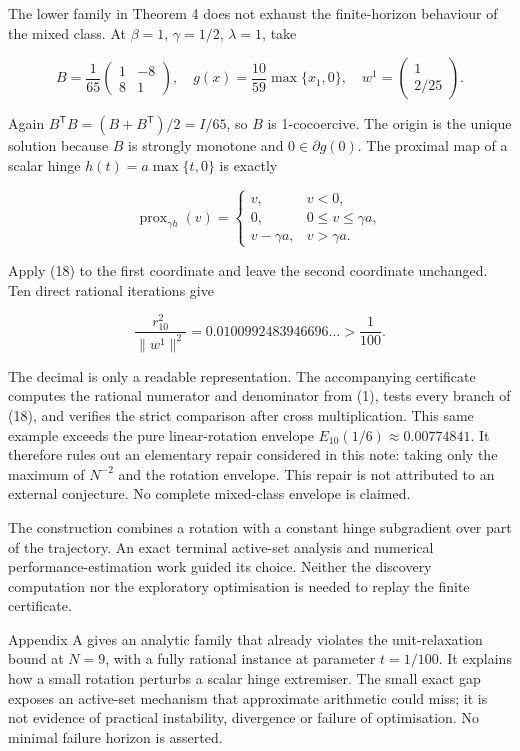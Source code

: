 \documentclass[
  british,
  11pt,
  a4paper,
]{article}
\begin{document}
The lower family in Theorem 4 does not exhaust the finite-horizon
behaviour of the mixed class. At \(\beta=1\), \(\gamma=1/2\),
\(\lambda=1\), take

\[
B=\frac1{65}\begin{pmatrix}1&-8\\8&1\end{pmatrix},
\quad g(x)=\frac{10}{59}\max\{x_1,0\},
\quad w^1=\begin{pmatrix}1\\2/25\end{pmatrix}.
\tag{17}
\]

Again \(B^\mathsf TB=(B+B^\mathsf T)/2=I/65\), so \(B\) is 1-cocoercive.
The origin is the unique solution because \(B\) is strongly monotone and
\(0\in\partial g(0)\). The proximal map of a scalar hinge
\(h(t)=a\max\{t,0\}\) is exactly

\[
\operatorname{prox}_{\gamma h}(v)=
\begin{cases}
v,&v<0,\\
0,&0\leq v\leq\gamma a,\\
v-\gamma a,&v>\gamma a.
\end{cases}
\tag{18}
\]

Apply (18) to the first coordinate and leave the second coordinate
unchanged. Ten direct rational iterations give

\[
\frac{r_{10}^2}{\|w^1\|^2}
=0.0100992483946696\ldots>\frac1{100}.
\tag{19}
\]

The decimal is only a readable representation. The accompanying
certificate computes the rational numerator and denominator from (1),
tests every branch of (18), and verifies the strict comparison after
cross multiplication. This same example exceeds the pure linear-rotation
envelope \(E_{10}(1/6)\approx0.00774841\). It therefore rules out an
elementary repair considered in this note: taking only the maximum of
\(N^{-2}\) and the rotation envelope. This repair is not attributed to
an external conjecture. No complete mixed-class envelope is claimed.

The construction combines a rotation with a constant hinge subgradient
over part of the trajectory. An exact terminal active-set analysis and
numerical performance-estimation work guided its choice. Neither the
discovery computation nor the exploratory optimisation is needed to
replay the finite certificate.

Appendix A gives an analytic family that already violates the
unit-relaxation bound at \(N=9\), with a fully rational instance at
parameter \(t=1/100\). It explains how a small rotation perturbs a
scalar hinge extremiser. The small exact gap exposes an active-set
mechanism that approximate arithmetic could miss; it is not evidence of
practical instability, divergence or failure of optimisation. No minimal
failure horizon is asserted.
\end{document}
